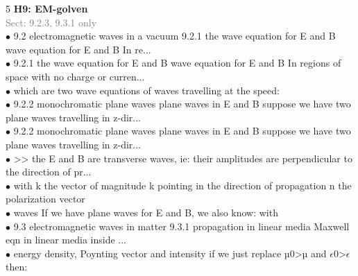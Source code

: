 \documentclass[7pt,a4paper]{article}
\begin{document}
\begin{multicols*}{5}
\textbf{H9: EM-golven}\\\textcolor{gray}{{Sect: 9.2.3, 9.3.1 only}}\\\vspace{0.5pt}
$\bullet$ 9.2 electromagnetic waves in a vacuum 
9.2.1 the wave equation for E and B 
wave equation for E and B In re...\\
$\bullet$ 9.2.1 the wave equation for E and B 
wave equation for E and B In regions of space with no charge or curren...\\
$\bullet$ which are two wave equations of waves travelling at the speed:\\
$\bullet$ 9.2.2 monochromatic plane waves 
plane waves in E and B suppose we have two plane waves travelling in z-dir...\\
$\bullet$ 9.2.2 monochromatic plane waves 
plane waves in E and B suppose we have two plane waves travelling in z-dir...\\
$\bullet$ >> the E and B are transverse waves, 
        ie: their amplitudes are perpendicular to the direction of pr...\\
$\bullet$ with k the vector of magnitude k pointing in the direction of propagation 
         n the polarization vector\\
$\bullet$ waves 
If we have plane waves for E and B, we also know: 
     with\\
$\bullet$ 9.3 electromagnetic waves in matter 
9.3.1 propagation in linear media 
Maxwell eqn in linear media inside ...\\
$\bullet$ energy density,  
Poynting vector and intensity 
if we just replace µ0>µ and $\epsilon$0>$\epsilon$ then:\\
\columnbreak


\end{multicols*}
\end{document}
